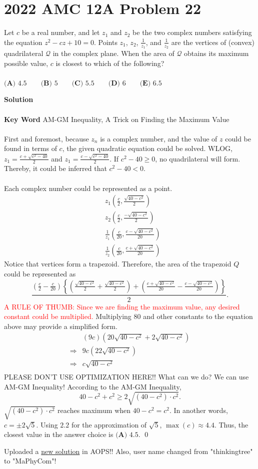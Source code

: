 \documentclass{article}
\newenvironment{solution}{\begin{trivlist}\item[]{\bf Solution}}{\qed \end{trivlist}}
\begin{document}
\newpage
\section*{2022 AMC 12A Problem 22}
Let $c$ be a real number, and let $z_1$ and $z_2$ be the two complex numbers satisfying the equation $z^2 - cz + 10 = 0$. Points $z_1$, $z_2$, $\frac{1}{z_1}$, and $\frac{1}{z_2}$ are the vertices of (convex) quadrilateral $\mathcal{Q}$ in the complex plane. When the area of $\mathcal{Q}$ obtains its maximum possible value, $c$ is closest to which of the following?
\\\\
$\textbf{(A) }4.5 \qquad\textbf{(B) }5 \qquad\textbf{(C) }5.5 \qquad\textbf{(D) }6\qquad\textbf{(E) }6.5$
\begin{solution}
\\\\
\textbf{Key Word} AM-GM Inequality, A Trick on Finding the Maximum Value
\\\\
First and foremost, because $z_n$ is a complex number, and the value of $z$ could be found in terms of $c$, the given quadratic equation could be solved. WLOG, $z_1=\frac{c+\sqrt{c^2-40}}{2}$ and $z_1=\frac{c-\sqrt{c^2-40}}{2}$. If $c^2-40\ge0$, no quadrilateral will form. Thereby, it could be inferred that $c^2-40<0$.
\\\\
Each complex number could be represented as a point.
\begin{align*}
    &z_1\left(\frac{c}{2}, \frac{\sqrt{40-c^2}}{2}\right) \\
    &z_2\left(\frac{c}{2}, \frac{-\sqrt{40-c^2}}{2}\right) \\
    &\frac{1}{z_1}\left(\frac{c}{20}, \frac{c-\sqrt{40-c^2}}{20}\right) \\
    &\frac{1}{z_2}\left(\frac{c}{20}, \frac{c+\sqrt{40-c^2}}{20}\right)
\end{align*}
Notice that vertices form a trapezoid. Therefore, the area of the trapezoid $Q$ could be represented as \[
\frac{\left(\frac{c}{2}-\frac{c}{20}\right)\left\{\left(\frac{\sqrt{40-c^2}}{2}+\frac{\sqrt{40-c^2}}{2}\right)+\left(\frac{c+\sqrt{40-c^2}}{20}-\frac{c-\sqrt{40-c^2}}{20}\right)\right\}}{2}.
\]
\textcolor{red}{A RULE OF THUMB: Since we are finding the maximum value, any desired constant could be multiplied.} Multiplying 80 and other constants to the equation above may provide a simplified form.
\begin{align*}
&(9c)(20\sqrt{40-c^2}+2\sqrt{40-c^2}) \\
\Rightarrow&9c(22\sqrt{40-c^2}) \\
\Rightarrow&c\sqrt{40-c^2} \\
\end{align*}
PLEASE DON'T USE OPTIMIZATION HERE!! What can we do? We can use AM-GM Inequality! According to the AM-GM Inequality,
\[
40-c^2+c^2\ge2\sqrt{(40-c^2)\cdot c^2}.
\]
$\sqrt{(40-c^2)\cdot c^2}$ reaches maximum when $40-c^2=c^2$. In another words, $c=\pm2\sqrt{5}$. Using $2.2$ for the approximation of $\sqrt{5}$, $\max(c)\approx4.4$. Thus, the closest value in the answer choice is $\boxed{\textbf{(A) }4.5}$.
\end{solution}
Uploaded a \href{https://artofproblemsolving.com/wiki/index.php/2022_AMC_12A_Problems/Problem_22#Solution_6_.28AM-GM_Inequality.29}{new solution} in AOPS!! Also, user name changed from "thinkingtree" to "MaPhyCom"! \\
\end{document}
